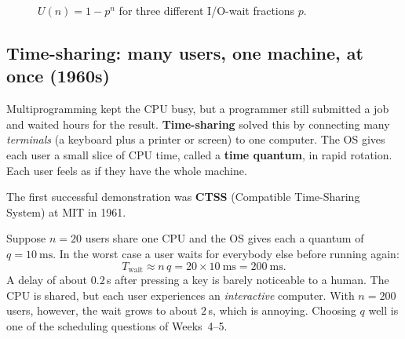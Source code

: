 \documentclass[11pt,a4paper]{article}
\newcommand{\term}[1]{\textbf{\color{mintdeep}#1}}
\begin{document}
\begin{figure}[H]
\centering
{}
\caption{$U(n)=1-p^{n}$ for three different I/O-wait fractions $p$.}
\end{figure}

\subsection{Time-sharing: many users, one machine, at once (1960s)}

Multiprogramming kept the CPU busy, but a programmer still submitted a job and waited hours for the result. \term{Time-sharing} solved this by connecting many \emph{terminals} (a keyboard plus a printer or screen) to one computer. The OS gives each user a small slice of CPU time, called a \term{time quantum}, in rapid rotation. Each user feels as if they have the whole machine.

The first successful demonstration was \textbf{CTSS} (Compatible Time-Sharing System) at MIT in 1961.

\begin{example}
Suppose $n = 20$ users share one CPU and the OS gives each a quantum of $q = 10\ \text{ms}$. In the worst case a user waits for everybody else before running again:
\[
T_{\text{wait}} \approx n\,q = 20 \times 10\ \text{ms} = 200\ \text{ms}.
\]
A delay of about $0.2$\,s after pressing a key is barely noticeable to a human. The CPU is shared, but each user experiences an \emph{interactive} computer. With $n=200$ users, however, the wait grows to about $2$\,s, which is annoying. Choosing $q$ well is one of the scheduling questions of Weeks~4--5.
\end{example}
\end{document}
